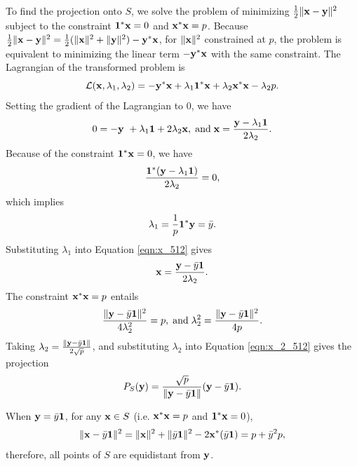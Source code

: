 \documentclass{scrartcl}
\begin{document}
To find the projection onto $S$, we solve the problem of minimizing
${1 \over 2}\|\mathbf{x}-\mathbf{y}\|^2$ subject to the constraint
$\mathbf{1}^*\mathbf{x} = 0$ and $\mathbf{x}^*\mathbf{x} = p$. Because
${1 \over 2}\|\mathbf{x}-\mathbf{y}\|^2 = {1 \over 2}(\|\mathbf{x}\|^2 + \|\mathbf{y}\|^2) - \mathbf{y}^*\mathbf{x}$,
for $\|\mathbf{x}\|^2$ constrained at $p$, the problem is equivalent to minimizing the
linear term $-\mathbf{y}^*\mathbf{x}$ with the same constraint. The Lagrangian of the transformed problem is
\begin{equation}
\mathcal{L}(\mathbf{x}, \lambda_1, \lambda_2)
= -\mathbf{y}^*\mathbf{x} + \lambda_1 \mathbf{1}^*\mathbf{x} + \lambda_2 \mathbf{x}^*\mathbf{x} - \lambda_2 p.
\end{equation}
Setting the gradient of the Lagrangian to 0, we have
\begin{equation}
0 = -\mathbf{y}\ + \lambda_1 \mathbf{1} + 2 \lambda_2 \mathbf{x} , \; \text{and} \;
\mathbf{x} = { {\mathbf{y} - \lambda_1 \mathbf{1}} \over {2 \lambda_2} }.
\label{eqn:x_512}
\end{equation}
Because of the constraint $\mathbf{1}^*\mathbf{x} = 0$, we have
\begin{equation}
{ { \mathbf{1}^*({\mathbf{y} - \lambda_1 \mathbf{1}}) } \over {2 \lambda_2} } = 0 ,
\end{equation}
which implies
\begin{equation}
\lambda_1 = {1 \over p} \mathbf{1}^*\mathbf{y} =  \bar{y}.
\end{equation}
Substituting $\lambda_1$ into Equation \eqref{eqn:x_512} gives
\begin{equation}
\mathbf{x} = { {\mathbf{y} - \bar{y} \mathbf{1}} \over {2 \lambda_2} } .
\label{eqn:x_2_512}
\end{equation}
The constraint $\mathbf{x}^*\mathbf{x} = p$ entails
\begin{equation}
{ \|{\mathbf{y} - \bar{y} \mathbf{1}}\|^2 \over {4 \lambda_2^2} } = p, \; \text{and} \;
\lambda_2^2 = { {\|{\mathbf{y} - \bar{y} \mathbf{1}}\|^2} \over {4p} }.
\end{equation}
Taking $\lambda_2 = { {\|{\mathbf{y} - \bar{y} \mathbf{1}}\|} \over {2 \sqrt{p}} }$, and substituting
$\lambda_2$ into Equation \eqref{eqn:x_2_512} gives the projection
\begin{equation}
 P_S(\mathbf{y}) = {\sqrt{p} \over {\|\mathbf{y}-\bar{y}\mathbf{1}\|}}(\mathbf{y}-\bar{y}\mathbf{1}).
\end{equation}

When $\mathbf{y} = \bar{y}\mathbf{1}$, for any $\mathbf{x} \in S$ (i.e. $\mathbf{x}^*\mathbf{x}=p$ and $\mathbf{1}^*\mathbf{x} = 0$),
\begin{equation}
\|\mathbf{x}-\bar{y}\mathbf{1}\|^2 = \|\mathbf{x}\|^2 + \|\bar{y}\mathbf{1}\|^2-2\mathbf{x}^*(\bar{y}\mathbf{1})
= p + \bar{y}^2 p,
\end{equation}
therefore, all points of $S$ are equidistant from $\mathbf{y}$.
\end{document}
